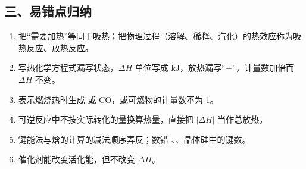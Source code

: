 \subsection*{三、易错点归纳}
\begin{enumerate}
\item 把“需要加热”等同于吸热；把物理过程（溶解、稀释、汽化）的热效应称为吸热反应、放热反应。
\item 写热化学方程式漏写状态，$\Delta H$ 单位写成 kJ，放热漏写“$-$”，计量数加倍而 $\Delta H$ 不变。
\item 表示燃烧热时生成  或 CO，或可燃物的计量数不为 1。
\item 可逆反应中不按实际转化的量换算热量，直接把 $|\Delta H|$ 当作总放热。
\item 键能法与焓的计算的减法顺序弄反；数错 、、晶体硅中的键数。
\item 催化剂能改变活化能，但不改变 $\Delta H$。
\end{enumerate}

